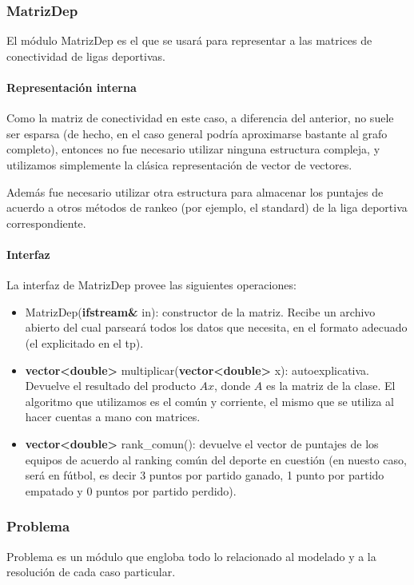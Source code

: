 \subsubsection{MatrizDep}
El módulo MatrizDep es el que se usará para representar a las matrices de conectividad de ligas deportivas.

\paragraph{Representación interna}

Como la matriz de conectividad en este caso, a diferencia del anterior, no suele ser esparsa (de hecho, en el caso general podría aproximarse bastante al grafo completo), entonces no fue necesario utilizar ninguna estructura compleja, y utilizamos simplemente la clásica representación de vector de vectores.

Además fue necesario utilizar otra estructura para almacenar los puntajes de acuerdo a otros métodos de rankeo (por ejemplo, el standard) de la liga deportiva correspondiente.

\paragraph{Interfaz}

La interfaz de MatrizDep provee las siguientes operaciones:
\begin{itemize}
    \item MatrizDep(\textbf{ifstream\&} in): constructor de la matriz. Recibe un archivo abierto del cual parseará todos los datos que necesita, en el formato adecuado (el explicitado en el tp).

    \item \textbf{vector<double>} multiplicar(\textbf{vector<double>} x): autoexplicativa. Devuelve el resultado del producto $Ax$, donde $A$ es la matriz de la clase. El algoritmo que utilizamos es el común y corriente, el mismo que se utiliza al hacer cuentas a mano con matrices.

    \item \textbf{vector<double>} rank\_comun(): devuelve el vector de puntajes de los equipos de acuerdo al ranking común del deporte en cuestión (en nuesto caso, será en fútbol, es decir 3 puntos por partido ganado, 1 punto por partido empatado y 0 puntos por partido perdido).
\end{itemize}




\subsubsection{Problema}
Problema es un módulo que engloba todo lo relacionado al modelado y a la resolución de cada caso particular.


